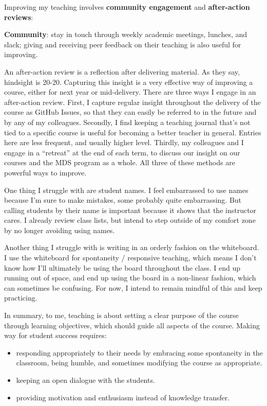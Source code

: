 \documentclass[]{book}
\providecommand{\tightlist}{%
  \setlength{\itemsep}{0pt}\setlength{\parskip}{0pt}}
\begin{document}
Improving my teaching involves \textbf{community engagement} and \textbf{after-action reviews}:

\textbf{Community}: stay in touch through weekly academic meetings, lunches, and slack; giving and receiving peer feedback on their teaching is also useful for improving.

An after-action review is a reflection after delivering material. As they say, hindsight is 20-20. Capturing this insight is a very effective way of improving a course, either for next year or mid-delivery. There are three ways I engage in an after-action review. First, I capture regular insight throughout the delivery of the course as GitHub Issues, so that they can easily be referred to in the future and by any of my colleagues. Secondly, I find keeping a teaching journal that's not tied to a specific course is useful for becoming a better teacher in general. Entries here are less frequent, and usually higher level. Thirdly, my colleagues and I engage in a ``retreat'' at the end of each term, to discuss our insight on our courses and the MDS program as a whole. All three of these methods are powerful ways to improve.

One thing I struggle with are student names. I feel embarrassed to use names because I'm sure to make mistakes, some probably quite embarrassing. But calling students by their name is important because it shows that the instructor cares. I already review class lists, but intend to step outside of my comfort zone by no longer avoiding using names.

Another thing I struggle with is writing in an orderly fashion on the whiteboard. I use the whiteboard for spontaneity / responsive teaching, which means I don't know how I'll ultimately be using the board throughout the class. I end up running out of space, and end up using the board in a non-linear fashion, which can sometimes be confusing. For now, I intend to remain mindful of this and keep practicing.

In summary, to me, teaching is about setting a clear purpose of the course through learning objectives, which should guide all aspects of the course. Making way for student success requires:

\begin{itemize}
\tightlist
\item
  responding appropriately to their needs by embracing some spontaneity in the classroom, being humble, and sometimes modifying the course as appropriate.
\item
  keeping an open dialogue with the students.
\item
  providing motivation and enthusiasm instead of knowledge transfer.
\end{itemize}
\end{document}
